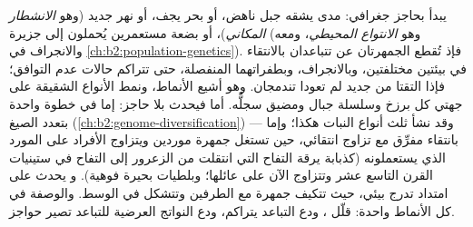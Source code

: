 \begin{proposition}\label{prop:b2:speciation:modes}
\emph{} يبدأ بحاجز جغرافي:
مدى يشقه جبل ناهض، أو بحر يجف، أو نهر جديد
(وهو \emph{الانشطار المكاني})، أو بضعة مستعمرين يُحملون إلى جزيرة
(وهو \emph{الانتواع المحيطي}، ومعه  والانجراف في
\cref{ch:b2:population-genetics}). فإذ تُقطع الجمهرتان عن 
تتباعدان بالانتقاء في بيئتين مختلفتين،
وبالانجراف، وبطفراتهما المنفصلة، حتى تتراكم حالات عدم التوافق؛
فإذا التقتا من جديد لم تعودا تندمجان. وهو
أشيع الأنماط، ونمط الأنواع الشقيقة على جهتي
كل برزخ وسلسلة جبال ومضيق سجلُّه.
أما \emph{} فيحدث بلا حاجز: إما في خطوة واحدة
بتعدد الصيغ (\cref{ch:b2:genome-diversification}) --- وقد نشأ ثلث
أنواع النبات هكذا؛ وإما بانتقاء مفرِّق مع تزاوج
انتقائي، حين تستغل جمهرة موردين ويتزاوج
الأفراد على المورد الذي يستعملونه (كذبابة يرقة التفاح
التي انتقلت من الزعرور إلى التفاح في ستينيات القرن التاسع عشر وتتزاوج الآن على
عائلها؛ وبلطيات بحيرة فوهية). و\emph{}
يحدث على امتداد تدرج بيئي، حيث تتكيف
جمهرة مع الطرفين وتتشكل  في
الوسط. والوصفة في كل الأنماط واحدة: قلّل ،
ودع التباعد يتراكم، ودع النواتج العرضية للتباعد
تصير حواجز.
\end{proposition}


